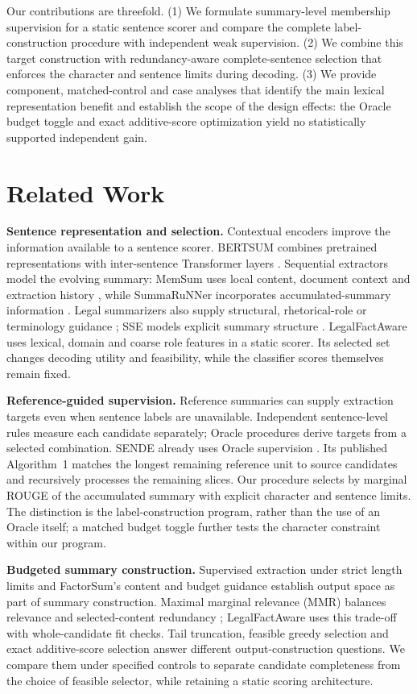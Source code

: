\documentclass[10pt,twocolumn,letterpaper]{article}
\begin{document}
Our contributions are threefold. (1) We formulate summary-level membership supervision for a static sentence scorer and compare the complete label-construction procedure with independent weak supervision. (2) We combine this target construction with redundancy-aware complete-sentence selection that enforces the character and sentence limits during decoding. (3) We provide component, matched-control and case analyses that identify the main lexical representation benefit and establish the scope of the design effects: the Oracle budget toggle and exact additive-score optimization yield no statistically supported independent gain.

\section{Related Work}\label{related-work}
\textbf{Sentence representation and selection.} Contextual encoders improve the information available to a sentence scorer. BERTSUM combines pretrained representations with inter-sentence Transformer layers \citep{ref1}. Sequential extractors model the evolving summary: MemSum uses local content, document context and extraction history \citep{ref2}, while SummaRuNNer incorporates accumulated-summary information \citep{summarunner2017}. Legal summarizers also supply structural, rhetorical-role or terminology guidance \citep{ref6,ref3,ref4}; SSE models explicit summary structure \citep{ref7}. LegalFactAware uses lexical, domain and coarse role features in a static scorer. Its selected set changes decoding utility and feasibility, while the classifier scores themselves remain fixed.

\textbf{Reference-guided supervision.} Reference summaries can supply extraction targets even when sentence labels are unavailable. Independent sentence-level rules measure each candidate separately; Oracle procedures derive targets from a selected combination. SENDE already uses Oracle supervision \citep{ref5}. Its published Algorithm~1 matches the longest remaining reference unit to source candidates and recursively processes the remaining slices. Our procedure selects by marginal ROUGE of the accumulated summary with explicit character and sentence limits. The distinction is the label-construction program, rather than the use of an Oracle itself; a matched budget toggle further tests the character constraint within our program.

\textbf{Budgeted summary construction.} Supervised extraction under strict length limits \citep{ref8} and FactorSum's content and budget guidance \citep{ref9} establish output space as part of summary construction. Maximal marginal relevance (MMR) balances relevance and selected-content redundancy \citep{mmr1998}; LegalFactAware uses this trade-off with whole-candidate fit checks. Tail truncation, feasible greedy selection and exact additive-score selection answer different output-construction questions. We compare them under specified controls to separate candidate completeness from the choice of feasible selector, while retaining a static scoring architecture.
\end{document}
